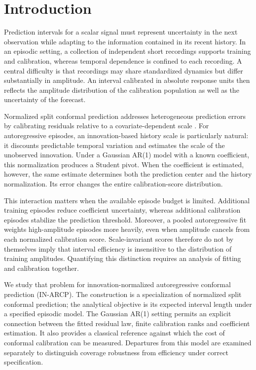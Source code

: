 \documentclass[nolineno]{ieeeaccess}
\begin{document}
\section{Introduction}
Prediction intervals for a scalar signal must represent uncertainty in the next observation while adapting to the information contained in its recent history. In an episodic setting, a collection of independent short recordings supports training and calibration, whereas temporal dependence is confined to each recording. A central difficulty is that recordings may share standardized dynamics but differ substantially in amplitude. An interval calibrated in absolute response units then reflects the amplitude distribution of the calibration population as well as the uncertainty of the forecast.

Normalized split conformal prediction addresses heterogeneous prediction errors by calibrating residuals relative to a covariate-dependent scale \cite{lei2018}. For autoregressive episodes, an innovation-based history scale is particularly natural: it discounts predictable temporal variation and estimates the scale of the unobserved innovation. Under a Gaussian AR(1) model with a known coefficient, this normalization produces a Student pivot. When the coefficient is estimated, however, the same estimate determines both the prediction center and the history normalization. Its error changes the entire calibration-score distribution.

This interaction matters when the available episode budget is limited. Additional training episodes reduce coefficient uncertainty, whereas additional calibration episodes stabilize the prediction threshold. Moreover, a pooled autoregressive fit weights high-amplitude episodes more heavily, even when amplitude cancels from each normalized calibration score. Scale-invariant scores therefore do not by themselves imply that interval efficiency is insensitive to the distribution of training amplitudes. Quantifying this distinction requires an analysis of fitting and calibration together.

We study that problem for innovation-normalized autoregressive conformal prediction (IN-ARCP). The construction is a specialization of normalized split conformal prediction; the analytical objective is its expected interval length under a specified episodic model. The Gaussian AR(1) setting permits an explicit connection between the fitted residual law, finite calibration ranks and coefficient estimation. It also provides a classical reference against which the cost of conformal calibration can be measured. Departures from this model are examined separately to distinguish coverage robustness from efficiency under correct specification.
\end{document}
